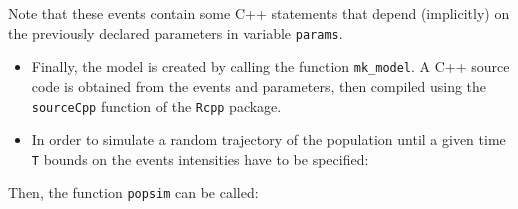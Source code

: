 Note that these events contain some C++ statements that depend (implicitly) on the previously declared parameters in variable \texttt{params}.

\begin{itemize}
\tightlist
\item
  Finally, the model is created by calling the function \texttt{mk\_model}. A C++ source code is obtained from the events and parameters, then compiled using the \texttt{sourceCpp} function of the \texttt{Rcpp} package.
\end{itemize}

\begin{Shaded}
\begin{Highlighting}[]
\OtherTok{\textless{}{-}} \NormalTok{(} 
                   
\end{Highlighting}
\end{Shaded}

\begin{itemize}
\tightlist
\item
  In order to simulate a random trajectory of the population until a given time \texttt{T} bounds on the events intensities have to be specified:
\end{itemize}

\begin{Shaded}
\begin{Highlighting}[]
\OtherTok{\textless{}{-}} 
\OtherTok{=} \NormalTok{(} \OtherTok{=}\SpecialCharTok{$}\SpecialCharTok{*} \SpecialCharTok{$}\SpecialCharTok{*}
                   \OtherTok{=} \SpecialCharTok{$}
\end{Highlighting}
\end{Shaded}

Then, the function \texttt{popsim} can be called:

\begin{Shaded}
\begin{Highlighting}[]
\OtherTok{\textless{}{-}} 
                   \NormalTok{)}
\end{Highlighting}
\end{Shaded}

